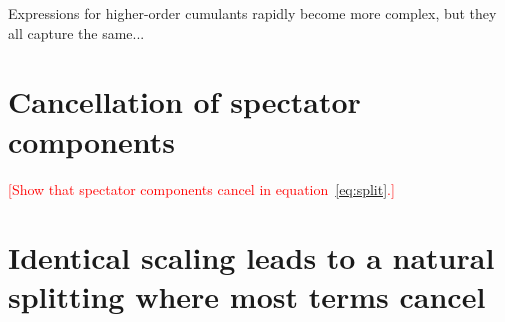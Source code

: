\documentclass{article}
\newcommand{\warning}[1]{{\textsf{{\textcolor{red}{{[#1]}{}}}}}}
\begin{document}
\begin{appendices}
Expressions for higher-order cumulants rapidly become more complex, but they all capture the same...


\section{Cancellation of spectator components}
\label{app:Spectator}
\warning{Show that spectator components cancel in equation~\ref{eq:split}.}


\section{Identical scaling leads to a natural splitting where most terms cancel}
\label{app:IDscaling}


\end{appendices}
\end{document}
